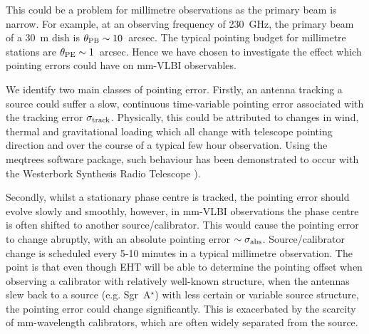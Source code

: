 This could be a problem for millimetre observations as the primary beam is narrow. For example, at an observing frequency of 230~GHz, the primary beam of a 30~m dish is $\theta_{\rm PB} \sim 10$~arcsec. The typical pointing budget for millimetre stations are $\theta_{\rm PE} \sim 1$~arcsec. Hence we have chosen to investigate the effect which pointing errors could have on mm-VLBI observables. 


We identify two main classes of pointing error. Firstly, an antenna tracking a source could suffer a slow, continuous time-variable pointing error associated with the tracking error $\sigma_{\rm track}$. Physically, this could be attributed to changes in wind, thermal and gravitational loading which all change with telescope pointing direction and over the course of a typical few hour observation. Using the {\sc meqtrees} software package, such behaviour has been demonstrated to occur with the Westerbork Synthesis Radio Telescope \citep[WSRT,]{Smirnov_Calim_2011,Smirnov_2011c}).


Secondly, whilst a stationary phase centre is tracked, the pointing error should evolve slowly and smoothly, however, in mm-VLBI observations the phase centre is often shifted to another source/calibrator. This would cause the pointing error to change abruptly, with an absolute pointing error $\sim \sigma_{\rm abs}$. Source/calibrator change is scheduled every 5-10 minutes in a typical millimetre observation. The point is that even though EHT will be able to determine the pointing offset when observing a calibrator with relatively well-known structure, when the antennas slew back to a source (e.g. Sgr~A$^\star$) with less certain or variable source structure, the pointing error could change significantly. This is exacerbated by the scarcity of mm-wavelength calibrators, which are often widely separated from the source.



